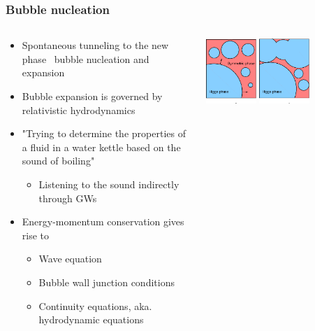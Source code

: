 \begin{frame}
    \frametitle{Bubble nucleation}
    \begin{columns}
    \begin{column}{0.6\textwidth}
        \begin{itemize}
            \item Spontaneous tunneling to the new phase \textrightarrow \ bubble nucleation and expansion
            \item Bubble expansion is governed by relativistic hydrodynamics
            \item "Trying to determine the properties of a fluid in a water kettle based on the sound of boiling"
            \begin{itemize}
                \item Listening to the sound indirectly through GWs
            \end{itemize}
            \item Energy-momentum conservation gives rise to
            \begin{itemize}
                \item Wave equation
                \item Bubble wall junction conditions
                \item Continuity equations, aka. hydrodynamic equations
            \end{itemize}
        \end{itemize}
    \end{column}
    \begin{column}{0.4\textwidth}
        \includegraphics[width=0.33\textwidth]{../fig/HiggsBubble1}%
        \includegraphics[width=0.33\textwidth]{../fig/HiggsBubble2}%

\end{column}
\end{columns}
\end{frame}
